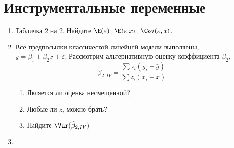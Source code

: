 \documentclass[pdftex,12pt,a4paper]{article}
\def \hb{\hat{\beta}}
\newcommand{\solution}[1]{}
\begin{document}
\section{Инструментальные переменные}

\begin{enumerate}
\item Табличка 2 на 2. Найдите $\E(\varepsilon)$, $\E(\varepsilon|x)$, $\Cov(\varepsilon,x)$.
\solution{}

\item Все предпосылки классической линейной модели выполнены, $y=\beta_1+\beta_2 x+\varepsilon$. Рассмотрим альтернативную оценку коэффициента $\beta_2$,
\begin{equation}
\hb_{2,IV}=\frac{\sum z_i(y_i-\bar{y})}{\sum z_i(x_i-\bar{x})}
\end{equation}
\begin{enumerate}
\item Является ли оценка несмещенной?
\item Любые ли $z_i$ можно брать?
\item Найдите $\Var(\hb_{2,IV})$
\end{enumerate}
\solution{Да, является. Любые, кроме констант. $\Var(\hb_{2,IV})=\sigma^2 \sum (z_i-\bar{z})^2/ \left(\sum (z_i-\bar{z})x_i \right)^2 $.}

\item 
\end{enumerate}
\end{document}
